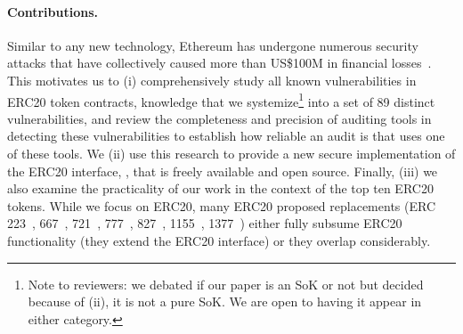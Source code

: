 \paragraph{Contributions.} Similar to any new technology, Ethereum has undergone numerous security attacks that have collectively caused more than US\$100M in financial losses~\cite{DAO1,PeckShield,PartiyMultiSig,MyEthWallet,ParityFirstHack,ParitySecondHack}. This motivates us to (i) comprehensively study all known vulnerabilities in ERC20 token contracts, knowledge that we systemize\footnote{Note to reviewers: we debated if our paper is an SoK or not but decided because of (ii), it is not a pure SoK. We are open to having it appear in either category.} into a set of 89 distinct vulnerabilities, and review the completeness and precision of auditing tools in detecting these vulnerabilities to establish how reliable an audit is that uses one of these tools. We (ii) use this research to provide a new secure implementation of the ERC20 interface, \sys, that is freely available and open source. Finally, (iii) we also examine the practicality of our work in the context of the top ten ERC20 tokens. While we focus on ERC20, many ERC20 proposed replacements (\ie ERC 223~\cite{Ref20}, 667~\cite{Ref21}, 721~\cite{Ref22}, 777~\cite{Ref23}, 827~\cite{Ref24}, 1155~\cite{Ref25}, 1377~\cite{Ref26}) either fully subsume ERC20 functionality (\ie they extend the ERC20 interface) or they overlap considerably.